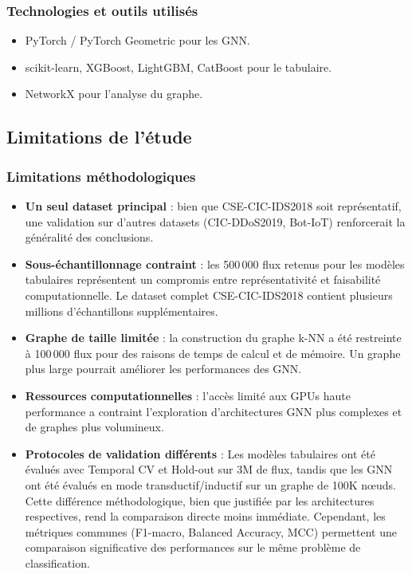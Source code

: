 ﻿\documentclass[11pt,a4paper]{article}
\begin{document}
\subsubsection{Technologies et outils utilisés}

\begin{itemize}
    \item PyTorch / PyTorch Geometric pour les GNN.
    \item scikit-learn, XGBoost, LightGBM, CatBoost pour le tabulaire.
    \item NetworkX pour l'analyse du graphe.
\end{itemize}

\subsection{Limitations de l'étude}

\subsubsection{Limitations méthodologiques}

\begin{itemize}
    \item \textbf{Un seul dataset principal} : bien que CSE-CIC-IDS2018 soit représentatif, une validation sur d'autres datasets (CIC-DDoS2019, Bot-IoT) renforcerait la généralité des conclusions.
    \item \textbf{Sous-échantillonnage contraint} : les 500\,000 flux retenus pour les modèles tabulaires représentent un compromis entre représentativité et faisabilité computationnelle. Le dataset complet CSE-CIC-IDS2018 contient plusieurs millions d'échantillons supplémentaires.
    \item \textbf{Graphe de taille limitée} : la construction du graphe k-NN a été restreinte à 100\,000 flux pour des raisons de temps de calcul et de mémoire. Un graphe plus large pourrait améliorer les performances des GNN.
    \item \textbf{Ressources computationnelles} : l'accès limité aux GPUs haute performance a contraint l'exploration d'architectures GNN plus complexes et de graphes plus volumineux.
    \item \textbf{Protocoles de validation différents} : Les modèles tabulaires ont été évalués avec Temporal CV et Hold-out sur 3M de flux, tandis que les GNN ont été évalués en mode transductif/inductif sur un graphe de 100K nœuds. Cette différence méthodologique, bien que justifiée par les architectures respectives, rend la comparaison directe moins immédiate. Cependant, les métriques communes (F1-macro, Balanced Accuracy, MCC) permettent une comparaison significative des performances sur le même problème de classification.
\end{itemize}
\end{document}
